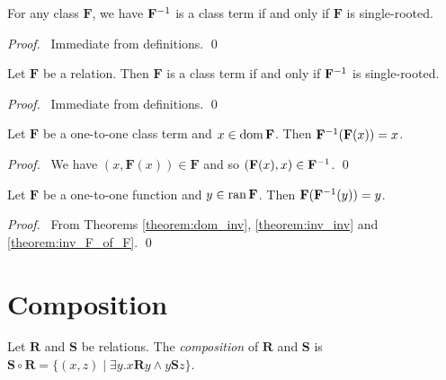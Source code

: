 \begin{theorem}[Pairing]
    \label{theorem:inv_function}
    For any class $\mathbf{F}$, we have ${\mathbf{F}}^{-1}$ is a class term if and only if $\mathbf{F}$ is single-rooted.
\end{theorem}

\begin{proof}
    \pf\ Immediate from definitions. \qed
\end{proof}

\begin{theorem}[Pairing]
    Let $\mathbf{F}$ be a relation. Then $\mathbf{F}$ is a class term if and only if ${\mathbf{F}}^{-1}$ is single-rooted.
\end{theorem}

\begin{proof}
    \pf\ Immediate from definitions. \qed
\end{proof}

\begin{theorem}[Pairing]
    \label{theorem:inv_F_of_F}
    Let $\mathbf{F}$ be a one-to-one class term and $x \in \operatorname{dom} \mathbf{F}$.
    Then ${\mathbf{F}}^{-1}(\mathbf{F}(x)) = x$.
\end{theorem}

\begin{proof}
    \pf\ We have $(x, \mathbf{F}(x)) \in \mathbf{F}$ and so 
    $(\mathbf{F}(x), x) \in {\mathbf{F}}^{-1}$. \qed
\end{proof}

\begin{theorem}[Pairing]
    Let $\mathbf{F}$ be a one-to-one function and $y \in \operatorname{ran} \mathbf{F}$.
    Then $\mathbf{F}({\mathbf{F}}^{-1}(y)) = y$.
\end{theorem}

\begin{proof}
    \pf\ From Theorems \ref{theorem:dom_inv}, \ref{theorem:inv_inv} and \ref{theorem:inv_F_of_F}. \qed
\end{proof}

\section{Composition}

\begin{definition}
    Let $\mathbf{R}$ and $\mathbf{S}$ be relations. 
    The \emph{composition} of $\mathbf{R}$ and $\mathbf{S}$ is
    $\mathbf{S} \circ \mathbf{R} = \{ (x,z) \mid \exists y. x \mathbf{R} y \wedge y \mathbf{S} z \}$.
\end{definition}

